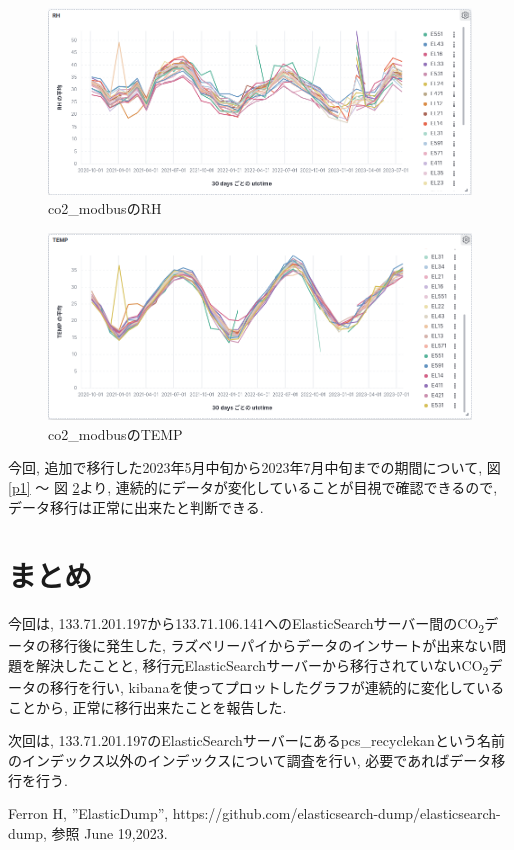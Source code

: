 \documentclass[a4j,12pt,]{jarticle}
\begin{document}
\begin{figure}[H]
  \begin{center}
    \includegraphics[width=160mm]{rh.png}
    \caption{co2\_modbusのRH}
    \label{p2}
  \end{center}
\end{figure}

\begin{figure}[H]
  \begin{center}
    \includegraphics[width=160mm]{temp.png}
    \caption{co2\_modbusのTEMP}
    \label{p3}
  \end{center}
\end{figure}

今回, 追加で移行した2023年5月中旬から2023年7月中旬までの期間について, 図 \ref{p1} 〜 図 \ref{p3}より, 連続的にデータが変化していることが目視で確認できるので, データ移行は正常に出来たと判断できる.

\section{まとめ}
今回は, 133.71.201.197から133.71.106.141へのElasticSearchサーバー間のCO\textsubscript{2}データの移行後に発生した, ラズベリーパイからデータのインサートが出来ない問題を解決したことと, 移行元ElasticSearchサーバーから移行されていないCO\textsubscript{2}データの移行を行い, kibanaを使ってプロットしたグラフが連続的に変化していることから, 正常に移行出来たことを報告した.

次回は, 133.71.201.197のElasticSearchサーバーにあるpcs\_recyclekanという名前のインデックス以外のインデックスについて調査を行い, 必要であればデータ移行を行う.

\begin{thebibliography}{5}
  Ferron H, ”ElasticDump”, https://github.com/elasticsearch-dump/elasticsearch-dump, 参照 June 19,2023.
\end{thebibliography}
\end{document}
